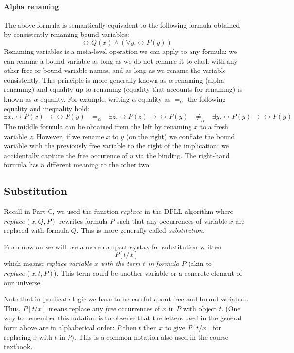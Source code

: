 \paragraph{Alpha renaming}
The above formula is
semantically equivalent to the following formula obtained by
consistently renaming bound variables:
%
\begin{equation*}
\rel{Q}(x) \wedge (\forall y . \rel{P}(y))
\end{equation*}
%
Renaming variables is a meta-level operation we can apply to any
formula: we can rename a bound variable as long as we do not rename it
to clash with any other free or bound variable names, and as long as
we rename the variable consistently. This principle is more generally
known as $\alpha$-renaming (alpha renaming) and equality up-to
renaming (equality that accounts for renaming) is known as
$\alpha$-equality. For example, writing $\alpha$-equality as
$=_{\alpha}$ the following equality and inequality hold:
%
\begin{equation*}
\exists x . \rel{P}(x) \rightarrow \rel{P}(y)
  \;\;\; =_{\alpha} \;\;\;
\exists z . \rel{P}(z) \rightarrow \rel{P}(y)
 \;\;\; \neq_{\alpha} \;\;\; \exists y . \rel{P}(y) \rightarrow \rel{P}(y)
\end{equation*}
%
The middle formula can be obtained from the left by renaming $x$ to a
fresh variable $z$. However, if we rename $x$ to $y$ (on the right)
we conflate the bound variable with the previously free variable to the
right of the implication; we accidentally capture the
free occurence of $y$ via the binding. The right-hand formula has
a different meaning to the other two.

\subsection{Substitution}

Recall in Part C, we used the function $\textit{replace}$ in the DPLL
algorithm where $\textit{replace}(x, Q, P)$ rewrites formula $P$ such
that any occurrences of variable $x$ are replaced with formula
$Q$. This is more generally called \emph{substitution}.

From now on we will use a more compact syntax for substitution
written $$P[t/x]$$ which means: \emph{replace variable $x$
with the term $t$ in formula $P$} (akin to $\textit{replace}(x, t,
P)$). This term could be another variable or a
concrete element of our universe.

Note that in predicate logic we have to be careful
about free and bound variables. Thus, $P[t/x]$ means replace any
\emph{free} occurrences of $x$ in $P$ with object $t$. (One way to remember
this notation is to observe that the letters used in the general
form above are in alphabetical order: $P$ then $t$ then $x$ to
give $P[t/x]$ for replacing $x$ with $t$ in $P$).  This is a common
notation also used in the course textbook.

